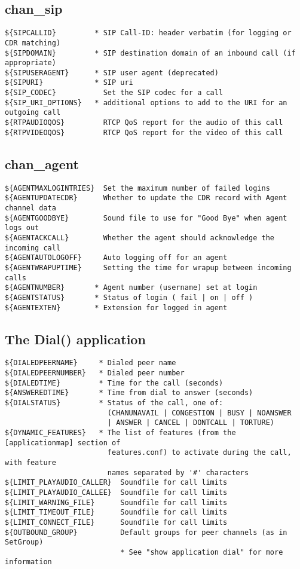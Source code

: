 \subsection{chan\_sip}
\begin{verbatim}
${SIPCALLID}         * SIP Call-ID: header verbatim (for logging or CDR matching)
${SIPDOMAIN}         * SIP destination domain of an inbound call (if appropriate)
${SIPUSERAGENT}      * SIP user agent (deprecated)
${SIPURI}            * SIP uri
${SIP_CODEC}           Set the SIP codec for a call
${SIP_URI_OPTIONS}   * additional options to add to the URI for an outgoing call
${RTPAUDIOQOS}         RTCP QoS report for the audio of this call
${RTPVIDEOQOS}         RTCP QoS report for the video of this call
\end{verbatim}

\subsection{chan\_agent}
\begin{verbatim}
${AGENTMAXLOGINTRIES}  Set the maximum number of failed logins
${AGENTUPDATECDR}      Whether to update the CDR record with Agent channel data
${AGENTGOODBYE}        Sound file to use for "Good Bye" when agent logs out
${AGENTACKCALL}        Whether the agent should acknowledge the incoming call
${AGENTAUTOLOGOFF}     Auto logging off for an agent
${AGENTWRAPUPTIME}     Setting the time for wrapup between incoming calls
${AGENTNUMBER}       * Agent number (username) set at login
${AGENTSTATUS}       * Status of login ( fail | on | off )
${AGENTEXTEN}        * Extension for logged in agent
\end{verbatim}


\subsection{The Dial() application}
\begin{verbatim}
${DIALEDPEERNAME}     * Dialed peer name
${DIALEDPEERNUMBER}   * Dialed peer number
${DIALEDTIME}         * Time for the call (seconds)
${ANSWEREDTIME}       * Time from dial to answer (seconds)
${DIALSTATUS}         * Status of the call, one of:
                        (CHANUNAVAIL | CONGESTION | BUSY | NOANSWER
                        | ANSWER | CANCEL | DONTCALL | TORTURE)
${DYNAMIC_FEATURES}   * The list of features (from the [applicationmap] section of
                        features.conf) to activate during the call, with feature
                        names separated by '#' characters
${LIMIT_PLAYAUDIO_CALLER}  Soundfile for call limits
${LIMIT_PLAYAUDIO_CALLEE}  Soundfile for call limits
${LIMIT_WARNING_FILE}      Soundfile for call limits
${LIMIT_TIMEOUT_FILE}      Soundfile for call limits
${LIMIT_CONNECT_FILE}      Soundfile for call limits
${OUTBOUND_GROUP}          Default groups for peer channels (as in SetGroup)
                           * See "show application dial" for more information
\end{verbatim}

